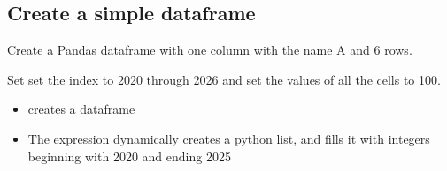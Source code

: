 \documentclass[letterpaper,10pt,english]{jupyterBook}
\begin{document}
\subsection{Create a  simple dataframe}
\label{\detokenize{content/04_PythonEssentials/mfcalc:create-a-simple-dataframe}}
\sphinxAtStartPar
Create a Pandas dataframe with one column with the name A and 6 rows.

\sphinxAtStartPar
Set set the index to 2020 through 2026 and set the values of all the cells to 100.
\begin{itemize}
\item {} 
\sphinxAtStartPar
{} creates a dataframe  

\item {} 
\sphinxAtStartPar
The expression  dynamically creates a  python list, and fills it with  integers beginning with 2020 and ending 2025

\end{itemize}
\end{document}
